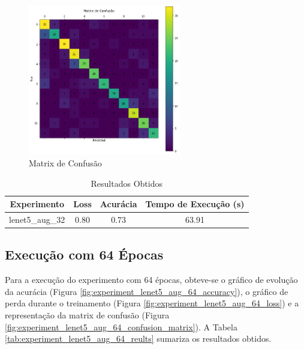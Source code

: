 \documentclass[12pt]{article}
\begin{document}
\begin{figure}[!htb]
  \centering
  \includegraphics[width=18em]{experiments/lenet5_aug_32/confusion_matrix.png}
  \caption{Matrix de Confusão}
  \label{fig:experiment_lenet5_aug_32_confusion_matrix}
\end{figure}

\begin{table}[!htb]
  \centering
  \begin{tabular}{|c|c|c|c|}
    \hline
    \textbf{Experimento} & \textbf{Loss} & \textbf{Acurácia} & \textbf{Tempo de Execução (s)} \\ \hline
    lenet5\_aug\_32      & 0.80          & 0.73              & 63.91                          \\ \hline
  \end{tabular}
  \caption{Resultados Obtidos}
  \label{tab:experiment_lenet5_aug_32_reults}
\end{table}

\newpage

\subsection{Execução com 64 Épocas}

Para a execução do experimento com 64 épocas, obteve-se o gráfico de evolução da acurácia (Figura \ref{fig:experiment_lenet5_aug_64_accuracy}), o gráfico de perda durante o treinamento (Figura \ref{fig:experiment_lenet5_aug_64_loss}) e a representação da matrix de confusão (Figura \ref{fig:experiment_lenet5_aug_64_confusion_matrix}). A Tabela \ref{tab:experiment_lenet5_aug_64_reults} sumariza os resultados obtidos.
\end{document}
